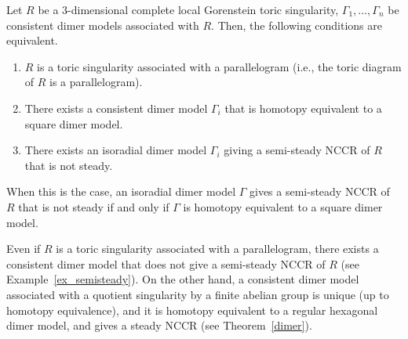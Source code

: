 \documentclass[ALCO,ThmDefs,Unicode]{cedram}
\begin{document}
\begin{theo}\label{main_thm}
Let $R$ be a $3$-dimensional complete local Gorenstein toric singularity, $\Gamma_1,\dots,\Gamma_n$ be consistent dimer models associated with $R$. Then, the following conditions are equivalent.
\begin{enumerate}%
\item\label{th4-2_1} $R$ is a toric singularity associated with a parallelogram (i.e., the toric diagram of $R$ is a parallelogram).
\item\label{th4-2_2} There exists a consistent dimer model $\Gamma_i$ that is homotopy equivalent to a square dimer model.
\item\label{th4-2_3} There exists an isoradial dimer model $\Gamma_i$ giving a semi-steady NCCR of $R$ that is not steady.
\end{enumerate}
When this is the case, an isoradial dimer model $\Gamma$ gives a semi-steady NCCR of $R$ that is not steady if and only if $\Gamma$ is homotopy equivalent to a square dimer model.
\end{theo}

\begin{rema}
Even if $R$ is a toric singularity associated with a parallelogram, there exists a consistent dimer model that does not give a semi-steady NCCR of $R$ (see Example~\ref{ex_semisteady}). On the other hand, a consistent dimer model associated with a quotient singularity by a finite abelian group is unique (up to homotopy equivalence), and it is homotopy equivalent to a regular hexagonal dimer model, and gives a steady NCCR (see Theorem~\ref{dimer}).
\end{rema}
\end{document}
